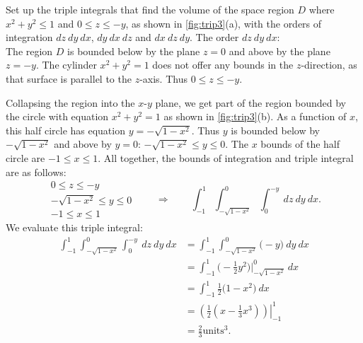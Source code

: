 
\begin{example}\label{ex_trip3}
Set up the triple integrals that find the volume of the space region $D$ where $x^2+y^2\le1$ and $0\le z\le-y$, as shown in \autoref{fig:trip3}(a), with the orders of integration $dz\ dy\ dx$, $dy\ dx\ dz$ and $dx\ dz\ dy$.
\solution
The order $dz\ dy\ dx$:\\

The region $D$ is bounded below by the plane $z=0$ and above by the plane $z=-y$. The cylinder $x^2+y^2=1$ does not offer any bounds in the $z$-direction, as that surface is parallel to the $z$-axis. Thus $0\leq z\leq -y$.

Collapsing the region into the $x$-$y$ plane, we get part of the region bounded by the circle with equation $x^2+y^2=1$ as shown in \autoref{fig:trip3}(b). As a function of $x$, this half circle has equation $y=-\sqrt{1-x^2}$. Thus $y$ is bounded below by $-\sqrt{1-x^2}$ and above by $y=0$: $-\sqrt{1-x^2}\leq y\leq 0$. The $x$ bounds of the half circle are $-1\leq x\leq 1$. All together, the bounds of integration and triple integral are  as follows:
\[
 \begin{gathered}
  0\leq z\leq -y\\
  -\sqrt{1-x^2}\leq y\leq 0\\
  -1\leq x\leq 1
 \end{gathered}
 \qquad\Rightarrow\qquad
 \int_{-1}^1\int_{-\sqrt{1-x^2}}^{0}\int_0^{-y}\ dz\ dy\ dx.
\]
We evaluate this triple integral:
\begin{align*}
	\int_{-1}^1\int_{-\sqrt{1-x^2}}^{0}\int_0^{-y}\ dz\ dy\ dx
	&= \int_{-1}^1\int_{-\sqrt{1-x^2}}^{0}\big(-y\big)\ dy\ dx\\
	&=\int_{-1}^1\big(-\frac12y^2\big)\Big|_{-\sqrt{1-x^2}}^{0}\ dx\\
	&= \int_{-1}^1 \frac12\big(1-x^2\big)\ dx\\
	&= \left.\left(\frac12\left(x-\frac13x^3\right)\right)\right|_{-1}^1\\
	&= \frac23\text{units}^3.
\end{align*}


\end{example}
